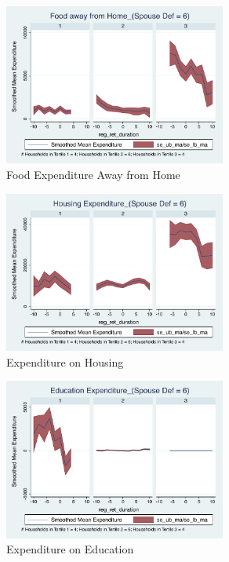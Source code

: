 \documentclass[11pt,onecolumn]{article}
\numberwithin{figure}{section}
\begin{document}
\begin{figure}[h]
	\caption{Food Expenditure Away from Home}
	\centering
	\includegraphics[width=0.65\textwidth]{../ConsumptionPostRetirement_by_SpouseDef_Cats/Smoothed/6/spouse_def_total_foodexp_away_real.pdf}
\end{figure}

\clearpage

\begin{figure}[h]
	\caption{Expenditure on Housing}
	\centering
	\includegraphics[width=0.65\textwidth]{../ConsumptionPostRetirement_by_SpouseDef_Cats/Smoothed/6/spouse_def_total_housing_real.pdf}
\end{figure}


\begin{figure}[h]
	\caption{Expenditure on Education}
	\centering
	\includegraphics[width=0.65\textwidth]{../ConsumptionPostRetirement_by_SpouseDef_Cats/Smoothed/6/spouse_def_total_education_real.pdf}
\end{figure}
\clearpage
\end{document}

